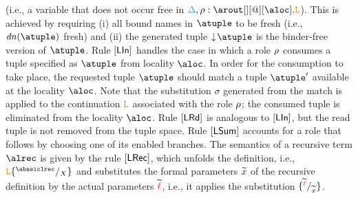  (i.e., a variable that does not occur free in $\envmv, \arole : \arout[][@][\aloc].\aL$).
This is achieved by requiring  (i) all bound names in $\atuple$ to be fresh (i.e., $\dn\atuple$  fresh) and 
(ii)  the generated tuple $\eraseB\atuple$ is the binder-free version of $\atuple$. 
Rule $\mathsf{[LIn]}$ handles the case in which a role $\rho$
consumes  a tuple specified as $\atuple$ from locality $\aloc$. In order for the consumption to
take place, the  requested tuple $\atuple$ should match  a tuple $\atuple'$ available 
at the locality $\aloc$. 
Note that the substitution $\sigma$ generated from the match is applied 
to the continuation $\texttt{\textcolor{orange}L}$ associated with the role $\rho$; the
consumed tuple is eliminated from the locality $\aloc$. 
%
Rule $\mathsf{[LRd]}$ is analogous to $\mathsf{[LIn]}$, but the 
read tuple is not removed from the tuple space.
%
Rule $\mathsf{[LSum]}$ accounts for a role that follows by choosing one of 
its enabled branches. 
%
The semantics of a recursive term $\alrec$ is given by the rule
 $\mathsf{[LRec]}$, which unfolds the  definition, i.e., $\aL\sust X{\abasiclrec}$
 and substitutes the formal parameters $\widetilde{x}$ of the recursive
 definition by the actual parameters $\widetilde{{\color{red}\ell}}$, i.e., it applies
 the substitution $\{^{\widetilde{{\color{red}\ell}}} / _{\widetilde{x}}\}$.



